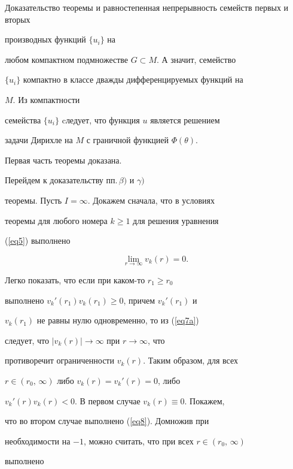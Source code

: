 \begin{pf*}{Доказательство теоремы}
и равностепенная непрерывность семейств первых и вторых


производных функций $\{u_i\}$ на


любом компактном подмножестве $G\subset M$. А значит, семейство


$\{u_i\}$ компактно в классе дважды дифференцируемых функций на


$M$. Из компактности


семейства $\{u_i\}$ cледует, что функция $u$ является решением


задачи Дирихле на $M$ с граничной функцией $\Phi(\theta)$.


Первая часть теоремы доказана.





Перейдем к доказательству пп.\,$\beta)$ и $\gamma)$


теоремы. Пусть $I=\infty$. Докажем сначала, что в условиях


теоремы для любого номера $k\ge 1$ для решения уравнения


(\ref{eq5}) выполнено


\begin{equation}


\lim_{r\to\infty} v_k(r)=0.


\label{eq8}


\end{equation}





Легко показать, что если при каком-то $r_1\ge r_0$


выполнено $v_k'(r_1)v_k(r_1)\ge 0$, причем $v_k'(r_1)$ и


$v_k(r_1)$ не равны нулю одновременно, то из (\ref{eq7a})


следует, что $|v_k(r)|\to\infty$ при $r\to\infty$, что


противоречит ограниченности $v_k(r)$. Таким образом, для всех


$r\in (r_0,\,\infty)$ либо $v_k(r)=v_k'(r)=0$, либо


$v_k'(r)v_k(r)<0$. В первом случае $v_k(r)\equiv 0$. Покажем,


что во втором случае выполнено (\ref{eq8}). Домножив при


необходимости на $-1$, можно считать, что при всех $r\in (r_0,\,\infty)$


выполнено


\begin{equation}



\end{equation}
\end{pf*}
